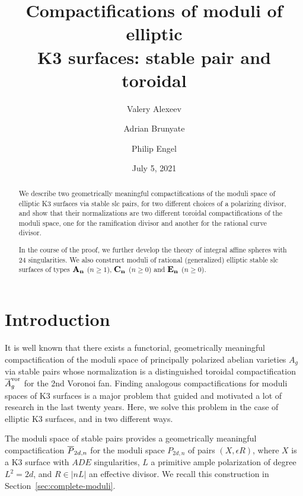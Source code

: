 \documentclass[table,x11names]{amsart}
\date{July 5, 2021}
\title[Compactification of moduli of elliptic K3 surfaces]
{Compactifications of moduli of elliptic\\ K3 surfaces: stable pair
  and toroidal}
\author{Valery Alexeev}
\author{Adrian Brunyate}
\author{Philip Engel}
\newcommand\vainline[1]{\todo[inline,color=green!40]{#1}} %
\begin{document}

\begin{abstract}
  We describe two geometrically meaningful compactifications of the moduli space of elliptic K3 surfaces via stable slc pairs, for two different choices of a polarizing divisor, and show that their normalizations are two different toroidal compactifications of the moduli space, one for the ramification divisor and another for the rational curve divisor. 

In the course of the proof, we further develop the theory of integral affine spheres with 24 singularities. 
We also construct moduli of rational (generalized) elliptic stable slc surfaces of types ${\bf A_n}$ ($n\ge1$), ${\bf C_n}$ ($n\ge0$) and ${\bf E_n}$ ($n\ge0$).
\end{abstract}

\maketitle 
\tableofcontents
\listoffigures
\listoftables


\section{Introduction}
\label{sec:intro}

It is well known \cite{mumford1972an-analytic-construction,
  namikawa1976a-new-compactification-of-the-siegel1,
  alexeev1999on-mumfords-construction,
  alexeev2002complete-moduli}
that there exists a functorial, geometrically meaningful
compactification of the moduli space of principally polarized abelian
varieties $A_g$ via stable pairs whose normalization is a
distinguished toroidal compactification ${\overline A}_g^{\rm vor}$ for the 2nd
Voronoi fan. Finding analogous compactifications for moduli spaces
of K3 surfaces is a major problem that guided and motivated a lot of
research in the last twenty years. Here, we solve this problem in the
case of elliptic K3 surfaces, and in two different ways.

The moduli space of stable pairs provides a geometrically meaningful
compactification ${\overline P}_{2d, n}$ for the moduli space $P_{2d, n}$ of
pairs $(X,\epsilon R)$, where $X$ is a K3 surface with $ADE$
singularities, $L$ a primitive ample polarization of degree $L^2=2d$,
and $R\in |nL|$ an effective divisor. We recall this construction in
Section~\ref{sec:complete-moduli}. 
\end{document}
